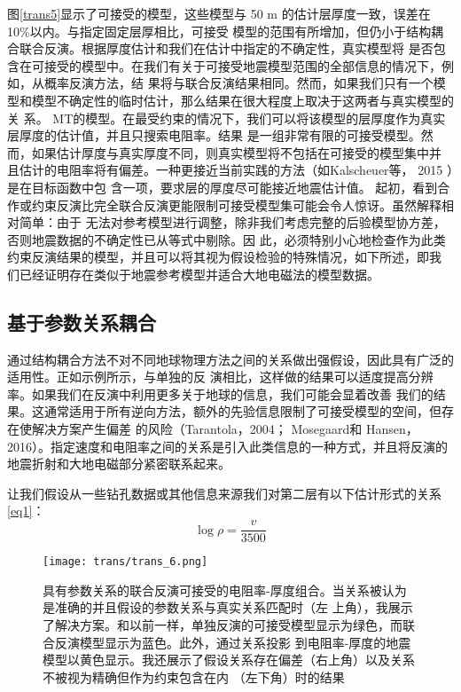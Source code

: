 图\ref{trans5}显示了可接受的模型，这些模型与 50 m 的估计层厚度一致，误差在 10\%以内。与指定固定层厚相比，可接受 模型的范围有所增加，但仍小于结构耦合联合反演。根据厚度估计和我们在估计中指定的不确定性，真实模型将 是否包含在可接受的模型中。在我们有关于可接受地震模型范围的全部信息的情况下，例如，从概率反演方法，结 果将与联合反演结果相同。然而，如果我们只有一个模型和模型不确定性的临时估计，那么结果在很大程度上取决于这两者与真实模型的关 系。 MT的模型。在最受约束的情况下，我们可以将该模型的层厚度作为真实层厚度的估计值，并且只搜索电阻率。结果 是一组非常有限的可接受模型。然而，如果估计厚度与真实厚度不同，则真实模型将不包括在可接受的模型集中并 且估计的电阻率将有偏差。一种更接近当前实践的方法（如Kalscheuer等， 2015 ）是在目标函数中包 含一项，要求层的厚度尽可能接近地震估计值。 起初，看到合作或约束反演比完全联合反演更能限制可接受模型集可能会令人惊讶。虽然解释相对简单：由于 无法对参考模型进行调整，除非我们考虑完整的后验模型协方差，否则地震数据的不确定性已从等式中剔除。因 此，必须特别小心地检查作为此类约束反演结果的模型，并且可以将其视为假设检验的特殊情况，如下所述，即我 们已经证明存在类似于地震参考模型并适合大地电磁法的模型数据。

\subsection{基于参数关系耦合}

通过结构耦合方法不对不同地球物理方法之间的关系做出强假设，因此具有广泛的适用性。正如示例所示，与单独的反 演相比，这样做的结果可以适度提高分辨率。如果我们在反演中利用更多关于地球的信息，我们可能会显着改善 我们的结果。这通常适用于所有逆向方法，额外的先验信息限制了可接受模型的空间，但存在使解决方案产生偏差 的风险（Tarantola，2004； Mosegaard和 Hansen，2016）。指定速度和电阻率之间的关系是引入此类信息的一种方式，并且将反演的地震折射和大地电磁部分紧密联系起来。

让我们假设从一些钻孔数据或其他信息来源我们对第二层有以下估计形式的关系\ref{eq1}：
\begin{equation}
    \log \rho = \frac{v}{3500} \label{eq1}
\end{equation}

\begin{figure}[]
    \centering
    \texttt{[image: trans/trans\_6.png]}
    \setcounter{figure}{5}
    \caption{具有参数关系的联合反演可接受的电阻率-厚度组合。当关系被认为是准确的并且假设的参数关系与真实关系匹配时（左 上角），我展示了解决方案。和以前一样，单独反演的可接受模型显示为绿色，而联合反演模型显示为蓝色。此外，通过关系投影 到电阻率-厚度的地震模型以黄色显示。我还展示了假设关系存在偏差（右上角）以及关系不被视为精确但作为约束包含在内 （左下角）时的结果}\label{trans6}

\end{figure}

